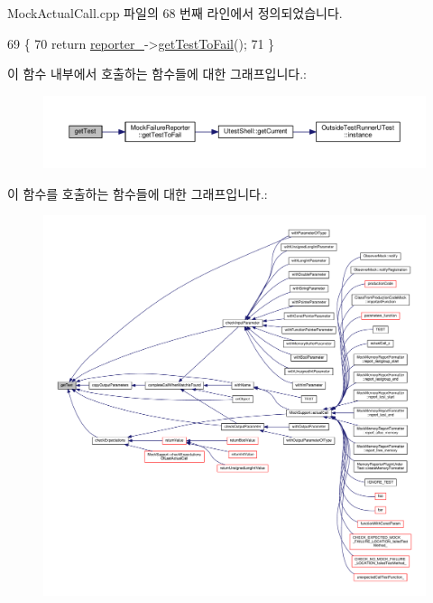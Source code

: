 Mock\+Actual\+Call.\+cpp 파일의 68 번째 라인에서 정의되었습니다.


\begin{DoxyCode}
69 \{
70     \textcolor{keywordflow}{return} \hyperlink{class_mock_checked_actual_call_a46f5703a1c6c55a7969c9f69cdbb5557}{reporter\_}->\hyperlink{class_mock_failure_reporter_ae3f75fac53b4d3395e02ee8eca858422}{getTestToFail}();
71 \}
\end{DoxyCode}


이 함수 내부에서 호출하는 함수들에 대한 그래프입니다.\+:
\nopagebreak
\begin{figure}[H]
\begin{center}
\leavevmode
\includegraphics[width=350pt]{class_mock_checked_actual_call_aa10112b41f7ed20162b12633042bb775_cgraph}
\end{center}
\end{figure}




이 함수를 호출하는 함수들에 대한 그래프입니다.\+:
\nopagebreak
\begin{figure}[H]
\begin{center}
\leavevmode
\includegraphics[width=350pt]{class_mock_checked_actual_call_aa10112b41f7ed20162b12633042bb775_icgraph}
\end{center}
\end{figure}


